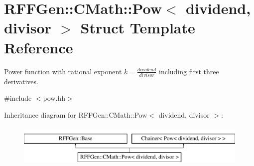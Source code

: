\hypertarget{structRFFGen_1_1CMath_1_1Pow}{\section{R\-F\-F\-Gen\-:\-:C\-Math\-:\-:Pow$<$ dividend, divisor $>$ Struct Template Reference}
\label{structRFFGen_1_1CMath_1_1Pow}
}


Power function with rational exponent $ k = \frac{dividend}{divisor} $ including first three derivatives.  




{\ttfamily \#include $<$pow.\-hh$>$}

Inheritance diagram for R\-F\-F\-Gen\-:\-:C\-Math\-:\-:Pow$<$ dividend, divisor $>$\-:\begin{figure}[H]
\begin{center}
\leavevmode
\includegraphics[height=2.000000cm]{structRFFGen_1_1CMath_1_1Pow}
\end{center}
\end{figure}
